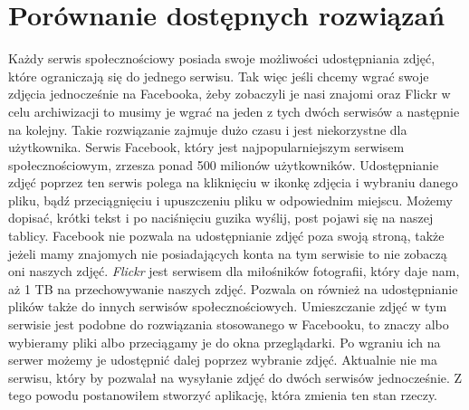 \documentclass[openright]{xmgr}
\begin{document}
\section{Porównanie dostępnych rozwiązań}
Każdy serwis społecznościowy posiada swoje możliwości udostępniania zdjęć, które ograniczają się do jednego serwisu. Tak więc jeśli chcemy wgrać swoje zdjęcia jednocześnie na Facebooka, żeby zobaczyli je nasi znajomi oraz Flickr w celu archiwizacji to musimy je wgrać na jeden z tych dwóch serwisów a następnie na kolejny. Takie rozwiązanie zajmuje dużo czasu i jest niekorzystne dla użytkownika. Serwis Facebook, który jest najpopularniejszym serwisem społecznościowym, zrzesza ponad 500 milionów użytkowników. Udostępnianie zdjęć poprzez ten serwis polega na kliknięciu w ikonkę zdjęcia i wybraniu danego pliku, bądź przeciągnięciu i upuszczeniu pliku w odpowiednim miejscu. Możemy dopisać, krótki tekst i po naciśnięciu guzika wyślij, post pojawi się na naszej tablicy. Facebook nie pozwala na udostępnianie zdjęć poza swoją stroną, także jeżeli mamy znajomych nie posiadających konta na tym serwisie to nie zobaczą oni naszych zdjęć. \newline \indent \textit{Flickr} jest serwisem dla miłośników fotografii, który daje nam, aż 1 TB na przechowywanie naszych zdjęć. Pozwala on również na udostępnianie plików także do innych serwisów społecznościowych. Umieszczanie zdjęć w tym serwisie jest podobne do rozwiązania stosowanego w Facebooku, to znaczy albo wybieramy pliki albo przeciągamy je do okna przeglądarki. Po wgraniu ich na serwer możemy je udostępnić dalej poprzez wybranie zdjęć. Aktualnie nie ma serwisu, który by pozwalał na wysyłanie zdjęć do dwóch serwisów jednocześnie. Z tego powodu postanowiłem stworzyć aplikację, która zmienia ten stan rzeczy.
\end{document}
